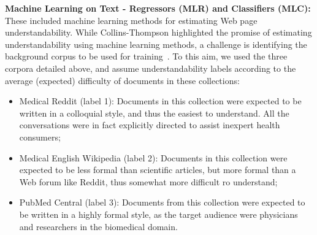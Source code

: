 


\textbf{Machine Learning on Text - Regressors (MLR) and Classifiers (MLC):} These included machine learning methods for estimating Web page understandability. While Collins-Thompson highlighted the promise of estimating understandability using machine learning methods, a challenge is identifying the background corpus to be used for training~\cite{collins2014computational}. To this aim, we used the three corpora detailed above, and assume understandability labels according to the average (expected) difficulty of documents in these collections:




\begin{itemize}
    \item Medical Reddit (label 1): Documents in this collection were expected to be written in a colloquial style, and thus the easiest to understand. All the conversations were in fact explicitly directed to assist inexpert health consumers;
    \item Medical English Wikipedia (label 2): Documents in this collection were expected to be less formal than scientific articles, but more formal than a Web forum like Reddit, thus somewhat more difficult ro understand;
    \item PubMed Central (label 3): Documents from this collection were expected to be written in a highly formal style, as the target audience were physicians and researchers in the biomedical domain.
\end{itemize}

